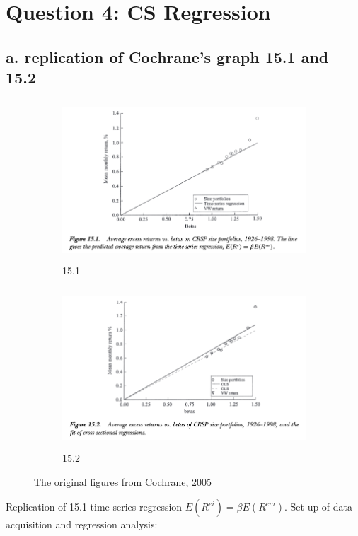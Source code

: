 \documentclass[]{article}
\title{}
\author{}
\begin{document}
	
	\maketitle
	
	
\section*{Question 4: CS Regression}
\subsection*{a. replication of Cochrane's graph 15.1 and 15.2}
	
\begin{figure}[h]
	\begin{subfigure}{0.5\textwidth}
		\includegraphics[width=1\linewidth, height=6cm]{Cochrane_15_1} 
		\caption{15.1}
		\label{fig:subim1}
	\end{subfigure}
	\begin{subfigure}{0.5\textwidth}
		\includegraphics[width=1\linewidth, height=6cm]{Cochrane_15_2}
		\caption{15.2}
		\label{fig:subim2}
	\end{subfigure}	
	\caption{The original figures from Cochrane, 2005}
	\label{fig:image1}
\end{figure}

Replication of 15.1 time series regression $E(R^{ei}) = \beta E(R^{em})$. Set-up of data acquisition and regression analysis:
\end{document}
